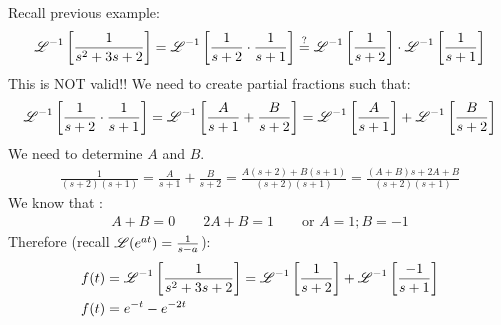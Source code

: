 Recall previous example:
\begin{align*}
\operatorname{\mathscr{L}}^{-1}\left[\frac{1}{s^2+3s+2}\right]=\operatorname{\mathscr{L}}^{-1}\left[\frac{1}{s+2}\cdot \frac{1}{s+1}\right]\stackrel{?}{=}\operatorname{\mathscr{L}}^{-1}\left[\frac{1}{s+2}\right]\cdot \operatorname{\mathscr{L}}^{-1}\left[\frac{1}{s+1}\right]
\end{align*}
This is NOT valid!! We need to create partial fractions such that:
\begin{align*}
\operatorname{\mathscr{L}}^{-1}\left[\frac{1}{s+2}\cdot \frac{1}{s+1}\right]=\operatorname{\mathscr{L}}^{-1}\left[\frac{A}{s+1}+\frac{B}{s+2}\right]=\operatorname{\mathscr{L}}^{-1}\left[\frac{A}{s+1}\right]+\operatorname{\mathscr{L}}^{-1}\left[\frac{B}{s+2}\right]
\end{align*}
We need to determine $A$ and $B$.\\
\begin{align*}
\frac{1}{(s+2)(s+1)}=\frac{A}{s+1}+\frac{B}{s+2}=\frac{A(s+2)+B(s+1)}{(s+2)(s+1)}=\frac{(A+B)s+2A+B}{(s+2)(s+1)}
\end{align*}
We know that :
\begin{align*}
A+B=0\qquad 2A+B=1 \qquad \text{or } A=1; B=-1
\end{align*}
Therefore (recall $\operatorname{\mathscr{L}}(e^{at})=\frac{1}{s-a}$):
\begin{align*}
f(t)&=\operatorname{\mathscr{L}}^{-1}\left[\frac{1}{s^2+3s+2}\right]=\operatorname{\mathscr{L}}^{-1}\left[\frac{1}{s+2}\right]+\operatorname{\mathscr{L}}^{-1}\left[\frac{-1}{s+1}\right]\\
f(t)&=e^{-t}-e^{-2t}
\end{align*}






